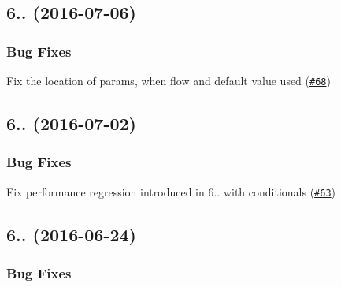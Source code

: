 \subsection*{6.. (2016-\/07-\/06)}

\subsubsection*{Bug Fixes}


\begin{DoxyItemize}
\item Fix the location of params, when flow and default value used (\href{https://github.com/babel/babylon/pull/68}{\tt \#68}) 
\end{DoxyItemize}

\subsection*{6.. (2016-\/07-\/02)}

\subsubsection*{Bug Fixes}


\begin{DoxyItemize}
\item Fix performance regression introduced in 6.. with conditionals (\href{https://github.com/babel/babylon/pull/63}{\tt \#63}) 
\end{DoxyItemize}

\subsection*{6.. (2016-\/06-\/24)}

\subsubsection*{Bug Fixes}


